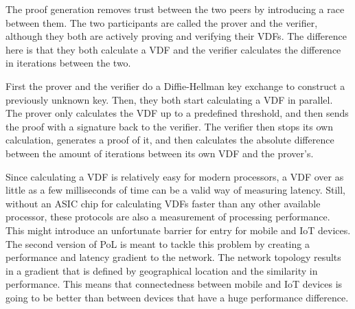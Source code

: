 The proof generation removes trust between the two peers by introducing a race between them. The two participants are called the prover and the verifier, although they both are actively proving and verifying their VDFs. The difference here is that they both calculate a VDF and the verifier calculates the difference in iterations between the two.

First the prover and the verifier do a Diffie-Hellman key exchange to construct a previously unknown key. Then, they both start calculating a VDF in parallel. The prover only calculates the VDF up to a predefined threshold, and then sends the proof with a signature back to the verifier. The verifier then stops its own calculation, generates a proof of it, and then calculates the absolute difference between the amount of iterations between its own VDF and the prover's.

Since calculating a VDF is relatively easy for modern processors, a VDF over as little as a few milliseconds of time can be a valid way of measuring latency. Still, without an ASIC chip for calculating VDFs faster than any other available processor, these protocols are also a measurement of processing performance. This might introduce an unfortunate barrier for entry for mobile and IoT devices. The second version of PoL is meant to tackle this problem by creating a performance and latency gradient to the network. The network topology results in a gradient that is defined by geographical location and the similarity in performance. This means that connectedness between mobile and IoT devices is going to be better than between devices that have a huge performance difference.

